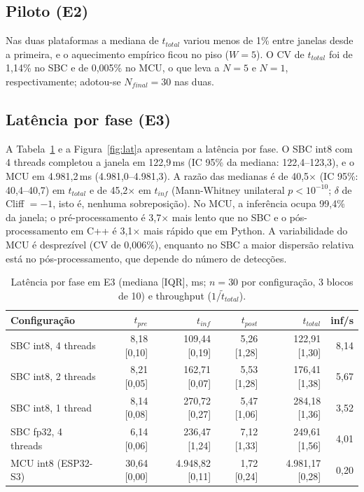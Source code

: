 \documentclass[11pt,a4paper]{article}
\begin{document}
\subsection{Piloto (E2)}
Nas duas plataformas a mediana de $t_{total}$ variou menos de 1\% entre janelas desde a primeira, e o
aquecimento empírico ficou no piso ($W=5$). O CV de $t_{total}$ foi de 1,14\% no SBC e de 0,005\% no MCU,
o que leva a $N=5$ e $N=1$, respectivamente; adotou-se $N_{final}=30$ nas duas.

\subsection{Latência por fase (E3)}
A Tabela~\ref{tab:e3} e a Figura~\ref{fig:lat}a apresentam a latência por fase. O SBC int8 com 4 threads
completou a janela em 122,9\,ms (IC 95\% da mediana: 122,4--123,3), e o MCU em 4.981,2\,ms (4.981,0--4.981,3).
A razão das medianas é de 40,5$\times$ (IC 95\%: 40,4--40,7) em $t_{total}$ e de 45,2$\times$ em $t_{inf}$
(Mann-Whitney unilateral $p<10^{-10}$; $\delta$ de Cliff $=-1$, isto é, nenhuma sobreposição). No MCU, a
inferência ocupa 99,4\% da janela; o pré-processamento é 3,7$\times$ mais lento que no SBC e o
pós-processamento em C++ é 3,1$\times$ mais rápido que em Python. A variabilidade do MCU é desprezível (CV de
0,006\%), enquanto no SBC a maior dispersão relativa está no pós-processamento, que depende do número de
detecções.

\begin{table}[H]\centering\small
\caption{Latência por fase em E3 (mediana [IQR], ms; $n=30$ por configuração, 3 blocos de 10) e throughput
($1/\tilde t_{total}$).}\label{tab:e3}
\begin{tabular}{lrrrrr}\toprule
Configuração & $t_{pre}$ & $t_{inf}$ & $t_{post}$ & $t_{total}$ & inf/s\\\midrule
SBC int8, 4 threads & 8,18 [0,10] & 109,44 [0,19] & 5,26 [1,28] & 122,91 [1,30] & 8,14\\
SBC int8, 2 threads & 8,21 [0,05] & 162,71 [0,07] & 5,53 [1,28] & 176,41 [1,38] & 5,67\\
SBC int8, 1 thread & 8,14 [0,08] & 270,72 [0,27] & 5,47 [1,06] & 284,18 [1,36] & 3,52\\
SBC fp32, 4 threads & 6,14 [0,06] & 236,47 [1,24] & 7,12 [1,33] & 249,61 [1,56] & 4,01\\
MCU int8 (ESP32-S3) & 30,64 [0,00] & 4.948,82 [0,11] & 1,72 [0,24] & 4.981,17 [0,28] & 0,20\\\bottomrule
\end{tabular}
\end{table}
\end{document}
